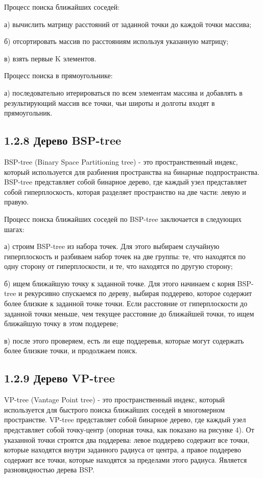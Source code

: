 Процесс поиска ближайших соседей:
\par а) вычислить матрицу расстояний от заданной точки до каждой точки массива;
\par б) отсортировать массив по расстояниям используя указанную матрицу;
\par в) взять первые K элементов.

Процесс поиска в прямоугольнике:
\par а) последовательно итерироваться по всем элементам массива и добавлять в результирующий массив все точки, чьи широты и долготы входят в прямоугольник.

\subsection{1.2.8 Дерево BSP-tree}
BSP-tree (Binary Space Partitioning tree) - это пространственный индекс, который используется для разбиения пространства на бинарные подпространства\cite{liuGBTree}. BSP-tree представляет собой бинарное дерево, где каждый узел представляет собой гиперплоскость, которая разделяет пространство на две части: левую и правую.

Процесс поиска ближайших соседей по BSP-tree заключается в следующих шагах:
\par а) строим BSP-tree из набора точек. Для этого выбираем случайную гиперплоскость и разбиваем набор точек на две группы: те, что находятся по одну сторону от гиперплоскости, и те, что находятся по другую сторону;
\par б) ищем ближайшую точку к заданной точке. Для этого начинаем с корня BSP-tree и рекурсивно спускаемся по дереву, выбирая поддерево, которое содержит более близкие к заданной точке точки. Если расстояние от гиперплоскости до заданной точки меньше, чем текущее расстояние до ближайшей точки, то ищем ближайшую точку в этом поддереве;
\par в) после этого проверяем, есть ли еще поддеревья, которые могут содержать более близкие точки, и продолжаем поиск.

\subsection{1.2.9 Дерево VP-tree}
VP-tree (Vantage Point tree) - это пространственный индекс, который используется для быстрого поиска ближайших соседей в многомерном пространстве. VP-tree представляет собой бинарное дерево, где каждый узел представляет собой точку-центр (опорная точка, как показано на рисунке 4). От указанной точки строятся два поддерева: левое поддерево содержит все точки, которые находятся внутри заданного радиуса от центра, а правое поддерево содержит все точки, которые находятся за пределами этого радиуса. Является разновидностью дерева BSP.

